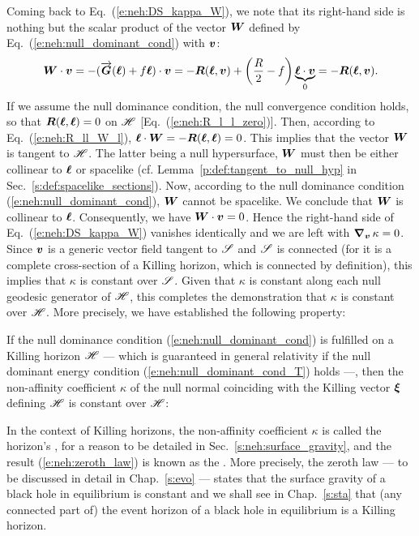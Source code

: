 Coming back to Eq.~(\ref{e:neh:DS_kappa_W}), we note that its right-hand side
is nothing but the scalar product of the vector $\bm{W}$
defined by Eq.~(\ref{e:neh:null_dominant_cond}) with $\bm{v}$:
\[
    \bm{W}\cdot\bm{v} = - (\overrightarrow{\bm{G}}(\bm{\ell}) + f \bm{\ell})\cdot\bm{v}
    = - \bm{R}(\bm{\ell}, \bm{v}) + \left( \frac{R}{2} - f \right) \underbrace{\bm{\ell}\cdot\bm{v}}_{0}
    = - \bm{R}(\bm{\ell}, \bm{v}) .
\]
If we assume the null dominance condition, the null convergence condition
holds, so that $\bm{R}(\bm{\ell}, \bm{\ell}) = 0$ on $\mathscr{H}$ [Eq.~(\ref{e:neh:R_l_l_zero})].
Then, according to Eq.~(\ref{e:neh:R_ll_W_l}),
$\bm{\ell} \cdot \bm{W} = - \bm{R}(\bm{\ell}, \bm{\ell}) = 0$.
This implies that the vector $\bm{W}$ is tangent to $\mathscr{H}$. The latter
being a null hypersurface, $\bm{W}$ must then be
either collinear to $\bm{\ell}$ or spacelike (cf. Lemma~\ref{p:def:tangent_to_null_hyp} in Sec.~\ref{s:def:spacelike_sections}).
Now, according to the null dominance condition (\ref{e:neh:null_dominant_cond}),
$\bm{W}$ cannot be
spacelike. We conclude that $\bm{W}$ is collinear to $\bm{\ell}$. Consequently,
we have $\bm{W}\cdot\bm{v} = 0$.
Hence the right-hand side of Eq.~(\ref{e:neh:DS_kappa_W}) vanishes identically
and we are left with $\bm{\nabla}_{\bm{v}} \, \kappa = 0$. Since $\bm{v}$ is a generic
vector field tangent to $\mathscr{S}$ and $\mathscr{S}$ is connected (for it is a complete cross-section
of a Killing horizon, which is connected by definition),
this implies that
$\kappa$ is constant over $\mathscr{S}$. Given that $\kappa$ is
constant along each null geodesic generator of $\mathscr{H}$, this completes the demonstration
that $\kappa$ is constant over $\mathscr{H}$. More precisely, we have established
the following property:

\begin{prop}
\label{p:neh:zeroth_law}
If the null dominance condition
(\ref{e:neh:null_dominant_cond})
is fulfilled on a Killing horizon $\mathscr{H}$ --- which is guaranteed in general relativity
if the null dominant energy condition (\ref{e:neh:null_dominant_cond_T}) holds ---, then the non-affinity coefficient $\kappa$
of the null normal coinciding with the Killing vector $\bm{\xi}$ defining $\mathscr{H}$
is constant over $\mathscr{H}$:
\be \label{e:neh:zeroth_law}
\ee
\end{prop}
In the context of Killing horizons, the non-affinity coefficient $\kappa$ is
called the horizon's ,
for a reason to be detailed in Sec.~\ref{s:neh:surface_gravity},
and the result
(\ref{e:neh:zeroth_law}) is known as the
. More precisely,
the zeroth law --- to be discussed in detail in Chap.~\ref{s:evo} ---
states that the surface gravity of a black hole in equilibrium is
constant and we shall see in Chap.~\ref{s:sta} that (any connected part of)
the event horizon of a black hole in equilibrium is a Killing horizon.


